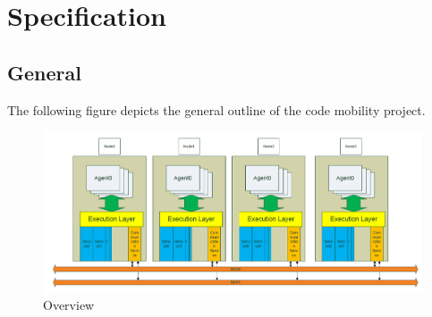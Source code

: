 \documentclass{scrreprt}
\begin{document}

\chapter {Specification}

\section{General}

The following figure depicts the general outline of the code mobility project.

\begin{figure}[!htb]
\includegraphics[scale=0.4]{figures/global.png}
\caption{Overview}
\end{figure}
\end{document}
